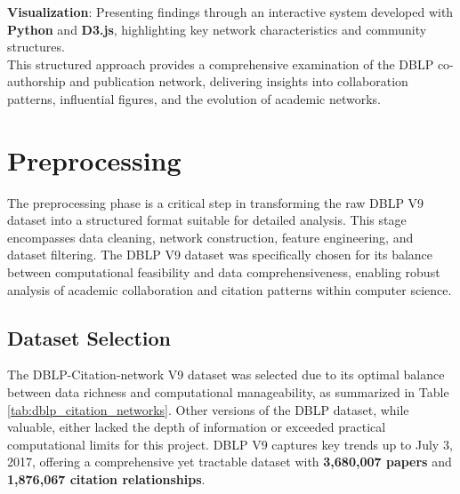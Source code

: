 \documentclass[11pt]{article}
\begin{document}
\textbf{Visualization}: Presenting findings through an interactive system developed with \textbf{Python} and \textbf{D3.js}, highlighting key network characteristics and community structures.
\\

This structured approach provides a comprehensive examination of the DBLP co-authorship and publication network, delivering insights into collaboration patterns, influential figures, and the evolution of academic networks.



\section{Preprocessing}

The preprocessing phase is a critical step in transforming the raw DBLP V9 dataset into a structured format suitable for detailed analysis. This stage encompasses data cleaning, network construction, feature engineering, and dataset filtering. The DBLP V9 dataset was specifically chosen for its balance between computational feasibility and data comprehensiveness, enabling robust analysis of academic collaboration and citation patterns within computer science.

\subsection{Dataset Selection}

The DBLP-Citation-network V9 dataset was selected due to its optimal balance between data richness and computational manageability, as summarized in Table \ref{tab:dblp_citation_networks}. Other versions of the DBLP dataset, while valuable, either lacked the depth of information or exceeded practical computational limits for this project. DBLP V9 captures key trends up to July 3, 2017, offering a comprehensive yet tractable dataset with \textbf{3,680,007 papers} and \textbf{1,876,067 citation relationships}.
\end{document}
